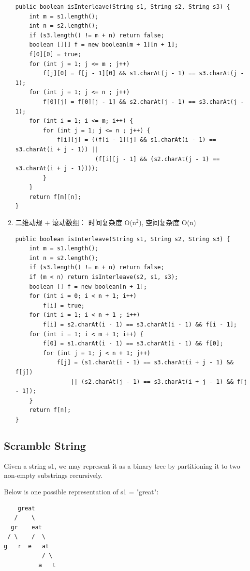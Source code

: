 \documentclass[12pt]{book}
\begin{document}
\begin{enumerate}
\lstset{language=java,label= ,caption= ,numbers=none}
\begin{lstlisting}
public boolean isInterleave(String s1, String s2, String s3) {
    int m = s1.length();
    int n = s2.length();
    if (s3.length() != m + n) return false;
    boolean [][] f = new boolean[m + 1][n + 1];
    f[0][0] = true;
    for (int j = 1; j <= m ; j++) 
        f[j][0] = f[j - 1][0] && s1.charAt(j - 1) == s3.charAt(j - 1);
    for (int j = 1; j <= n ; j++) 
        f[0][j] = f[0][j - 1] && s2.charAt(j - 1) == s3.charAt(j - 1);
    for (int i = 1; i <= m; i++) {
        for (int j = 1; j <= n ; j++) {
            f[i][j] = ((f[i - 1][j] && s1.charAt(i - 1) == s3.charAt(i + j - 1)) ||
                       (f[i][j - 1] && (s2.charAt(j - 1) == s3.charAt(i + j - 1))));
        }
    }
    return f[m][n];
}
\end{lstlisting}
\item 二维动规 + 滚动数组： 时间复杂度 O(n$^{\text{2}}$), 空间复杂度 O(n)
\label{sec-14-3-7-3}
\lstset{language=java,label= ,caption= ,numbers=none}
\begin{lstlisting}
public boolean isInterleave(String s1, String s2, String s3) {
    int m = s1.length();
    int n = s2.length();
    if (s3.length() != m + n) return false;
    if (m < n) return isInterleave(s2, s1, s3);
    boolean [] f = new boolean[n + 1];
    for (int i = 0; i < n + 1; i++) 
        f[i] = true;
    for (int i = 1; i < n + 1 ; i++) 
        f[i] = s2.charAt(i - 1) == s3.charAt(i - 1) && f[i - 1];
    for (int i = 1; i < m + 1; i++) {
        f[0] = s1.charAt(i - 1) == s3.charAt(i - 1) && f[0];
        for (int j = 1; j < n + 1; j++) 
            f[j] = (s1.charAt(i - 1) == s3.charAt(i + j - 1) && f[j])
                || (s2.charAt(j - 1) == s3.charAt(i + j - 1) && f[j - 1]);
    }
    return f[n];
}
\end{lstlisting}
\end{enumerate}

\subsection{Scramble String}
\label{sec-14-3-8}
Given a string s1, we may represent it as a binary tree by partitioning it to two non-empty substrings recursively.

Below is one possible representation of s1 = "great":

\lstset{language=java,label= ,caption= ,numbers=none}
\begin{lstlisting}
    great
   /    \
  gr    eat
 / \    /  \
g   r  e   at
           / \
          a   t
\end{lstlisting}
\end{document}
